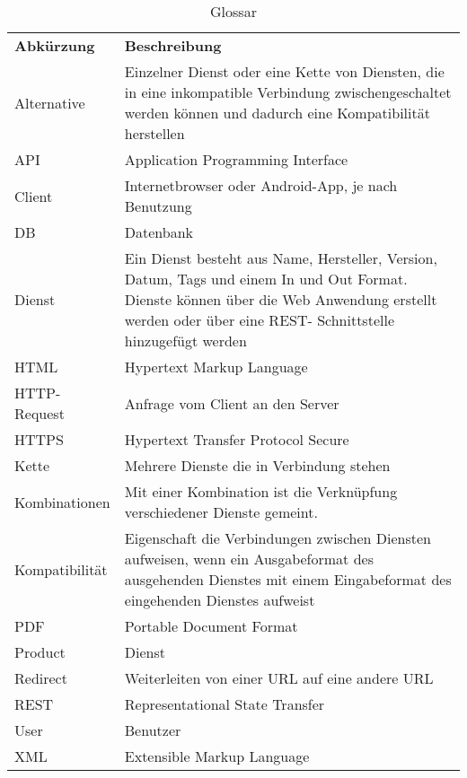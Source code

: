 \begin{table}[h]
	\centering
	\begin{tabularx}{\textwidth}{X X}
		\rowcolor[HTML]{C0C0C0}
		\textbf{Abkürzung} & \textbf{Beschreibung} \\
		Alternative & Einzelner Dienst oder eine Kette von Diensten, die in eine inkompatible Verbindung zwischengeschaltet werden können und dadurch eine Kompatibilität herstellen\\
		\rowcolor[HTML]{E7E7E7}
		API & Application Programming Interface \\
		Client & Internetbrowser oder Android-App, je nach Benutzung\\
		\rowcolor[HTML]{E7E7E7}
		DB & Datenbank\\
		Dienst & Ein Dienst besteht aus Name, Hersteller, Version, Datum, Tags und einem In und Out Format. Dienste können über die Web Anwendung erstellt werden oder über eine REST- Schnittstelle hinzugefügt werden \\
		\rowcolor[HTML]{E7E7E7}
		HTML & Hypertext Markup Language\\
		HTTP-Request & Anfrage vom Client an den Server\\
		\rowcolor[HTML]{E7E7E7}
		HTTPS & Hypertext Transfer Protocol Secure\\
		Kette & Mehrere Dienste die in Verbindung stehen\\
		\rowcolor[HTML]{E7E7E7}
		Kombinationen & Mit einer Kombination ist die Verknüpfung verschiedener Dienste gemeint.\\
		Kompatibilität & Eigenschaft die Verbindungen zwischen Diensten aufweisen, wenn ein Ausgabeformat des ausgehenden Dienstes mit einem Eingabeformat des eingehenden Dienstes aufweist\\
		\rowcolor[HTML]{E7E7E7}
		PDF & Portable Document Format\\
		Product & Dienst \\
		\rowcolor[HTML]{E7E7E7}
    Redirect & Weiterleiten von einer URL auf eine andere URL \\
		REST & Representational State Transfer \\
    \rowcolor[HTML]{E7E7E7}
		User & Benutzer\\
		XML & Extensible Markup Language\\
	\end{tabularx}
	\caption{Glossar}
	\label{table:glossar}
\end{table}
